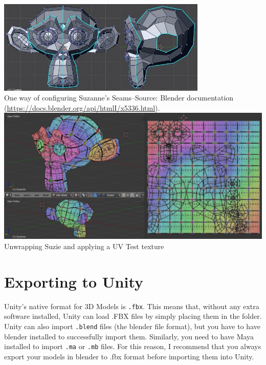 \documentclass[11pt]{article}
\begin{document}
\begin{center}
    \vbox{
    \includegraphics[width=0.75\textwidth]{suzie-seams}\\
    One way of configuring Suzanne's Seams--Source: Blender documentation (\href{https://docs.blender.org/api/htmlI/x5336.html}{https://docs.blender.org/api/htmlI/x5336.html}).}
    \includegraphics[width=1.0\textwidth]{suzie-textured}\\
    Unwrapping Suzie and applying a UV Test texture
\end{center}

\section{Exporting to Unity}

Unity's native format for 3D Models is \lstinline|.fbx|.  This means that, without any extra software
installed, Unity can load .FBX files by simply placing them in the  folder.
Unity can also import \lstinline|.blend| files (the blender file format), but you have to have
blender installed to successfully import them.  Similarly, you need to have Maya installed to import
\lstinline|.ma| or \lstinline|.mb| files.  For this reason, I recommend that you always export your
models in blender to .fbx format before importing them into Unity.
\end{document}
